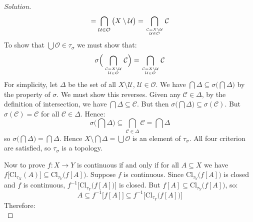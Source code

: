 \documentclass{article}
\theoremstyle{normal}
\begin{document}
\begin{proof}[Solution]
\begin{equation}
            =\bigcap_{\mathcal{U}\in\mathcal{O}}\big(X\setminus\mathcal{U}\big)
            =\bigcap_{{\mathcal{C}=X\setminus\mathcal{U}}\atop{\mathcal{U}\in\mathcal{O}}}\mathcal{C}
        \end{equation}
        To show that $\bigcup\mathcal{O}\in\tau_{\sigma}$ we must show that:
        \begin{equation}
            \sigma\Big(
            \bigcap_{{\mathcal{C}=X\setminus\mathcal{U}}\atop{\mathcal{U}\in\mathcal{O}}}\mathcal{C}
            \Big)
            =\bigcap_{{\mathcal{C}=X\setminus\mathcal{U}}\atop{\mathcal{U}\in\mathcal{O}}}\mathcal{C}
        \end{equation}
        For simplicity, let $\Delta$ be the set of all $X\setminus\mathcal{U}$,
        $\mathcal{U}\in\mathcal{O}$. We have
        $\bigcap\Delta\subseteq\sigma\big(\bigcap\Delta)$ by the property of
        $\sigma$. We must show this reverses. Given any $\mathcal{C}\in\Delta$,
        by the definition of intersection, we have
        $\bigcap\Delta\subseteq\mathcal{C}$. But then
        $\sigma\big(\bigcap\Delta\big)\subseteq\sigma(\mathcal{C})$. But
        $\sigma(\mathcal{C})=\mathcal{C}$ for all $\mathcal{C}\in\Delta$. Hence:
        \begin{equation}
            \sigma\Big(\bigcap\Delta\Big)
            \subseteq\bigcap_{\mathcal{C}\in\Delta}\mathcal{C}
            =\bigcap\Delta
        \end{equation}
        so $\sigma\big(\bigcap\Delta\big)=\bigcap\Delta$. Hence
        $X\setminus\bigcap\Delta=\bigcup\mathcal{O}$ is an element of
        $\tau_{\sigma}$. All four criterion are satisfied, so $\tau_{\sigma}$ is
        a topology.
        \par\hfill\par
        Now to prove $f:X\rightarrow{Y}$ is continuous if and only if
        for all $A\subseteq{X}$ we have
        $f\big[\textrm{Cl}_{\tau_{X}}(A)\big]\subseteq\textrm{Cl}_{\tau_{Y}}\big(f[A]\big)$.
        Suppose $f$ is continuous. Since
        $\textrm{Cl}_{\tau_{Y}}\big(f[A]\big)$ is closed and $f$ is continuous,
        $f^{-1}\Big[\textrm{Cl}_{\tau_{Y}}\big(f[A]\big)\Big]$ is closed. But
        $f[A]\subseteq\textrm{Cl}_{\tau_{Y}}\big(f[A]\big)$, so:
        \begin{equation}
            A\subseteq{f}^{-1}\big[f[A]\big]
            \subseteq{f}^{-1}\Big[\textrm{Cl}_{\tau_{Y}}\big(f[A]\big)\Big]
        \end{equation}
        Therefore:
        \begin{equation}

\end{equation}
\end{proof}
\end{document}
